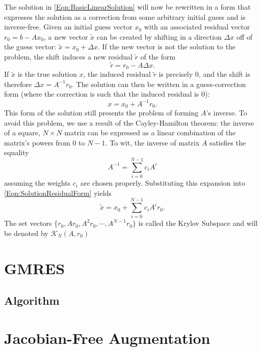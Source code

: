 \documentclass[Prelim,12pt]{WisconsinThesis}
\newcommand{\by}    {\!\times\!}
\newcommand{\dx}    {\ensuremath{\Delta{x}}}
\begin{document}
The solution in \cref{Eqn:BasicLinearSolution} will now be rewritten in a form that expresses the solution as a correction from some arbitrary initial guess and is inverse-free.
Given an initial guess vector $x_0$ with an associated residual vector $r_0 = b - A x_0$, a new vector $\tilde{x}$ can be created by shifting in a direction \dx{} off of the guess vector: $\tilde{x} = x_0 + \dx$.
If the new vector is not the solution to the problem, the shift induces a new residual $\tilde{r}$ of the form
\begin{equation}
    \tilde{r} = r_0  - A \dx.
    \label{Eqn:ResidualUpdateForm}
\end{equation}
If $\tilde{x}$ is the true solution $x$, the induced residual $\tilde{r}$ is precisely $0$, and the shift is therefore $\dx = A^{-1}r_0$.
The solution can then be written in a guess-correction form (where the correction is such that the induced residual is $0$):
\begin{equation}
     x = x_0 + A^{-1}r_0.
    \label{Eqn:SolutionResidualForm}
\end{equation}
This form of the solution still presents the problem of forming $A$'s inverse.
To avoid this problem, we use a result of the Cayley-Hamilton theorem: the inverse of a square, $N \by N$ matrix can be expressed as a linear combination of the matrix's powers from $0$ to $N-1$.
To wit, the inverse of matrix $A$ satisfies the equality
\begin{equation}
    A^{-1} = \sum_{i = 0}^{N-1} c_i A^i
\end{equation}
assuming the weights $c_i$ are chosen properly.
Substituting this expansion into \cref{Eqn:SolutionResidualForm} yields
\begin{equation}
    \tilde{x} = x_0 + \sum_{i = 0}^{N-1} c_i A^i r_0.
\end{equation}
The set vectors $\{r_0 , A r_0 ,A^2 r_0, \cdots ,A^{N-1} r_0\}$ is called the Krylov Subspace and will be denoted by $\mathcal{K}_N(A,r_0)$


\section{GMRES}
\subsection{Algorithm}


\section{Jacobian-Free Augmentation}
\end{document}
